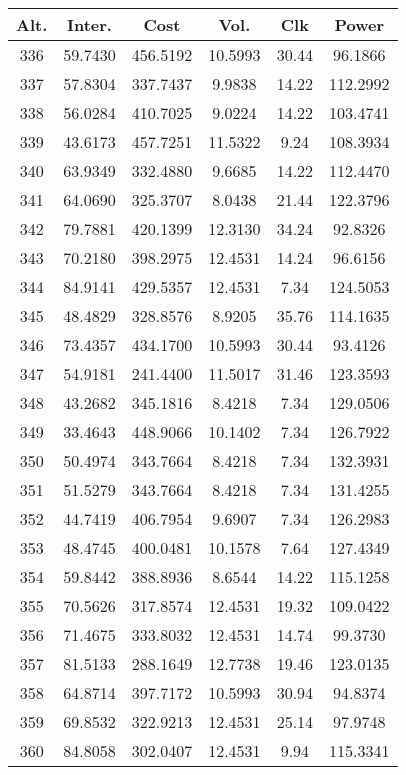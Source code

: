 \begin{center}
\begin{footnotesize}
\begin{tabular}{|c|ccccc|}
\hline
Alt. & Inter. & Cost & Vol. & Clk & Power\\
\hline
336 & 59.7430 & 456.5192 & 10.5993 & 30.44 & 96.1866 \\
337 & 57.8304 & 337.7437 & 9.9838 & 14.22 & 112.2992 \\
338 & 56.0284 & 410.7025 & 9.0224 & 14.22 & 103.4741 \\
339 & 43.6173 & 457.7251 & 11.5322 & 9.24 & 108.3934 \\
340 & 63.9349 & 332.4880 & 9.6685 & 14.22 & 112.4470 \\
341 & 64.0690 & 325.3707 & 8.0438 & 21.44 & 122.3796 \\
342 & 79.7881 & 420.1399 & 12.3130 & 34.24 & 92.8326 \\
343 & 70.2180 & 398.2975 & 12.4531 & 14.24 & 96.6156 \\
344 & 84.9141 & 429.5357 & 12.4531 & 7.34 & 124.5053 \\
345 & 48.4829 & 328.8576 & 8.9205 & 35.76 & 114.1635 \\
346 & 73.4357 & 434.1700 & 10.5993 & 30.44 & 93.4126 \\
347 & 54.9181 & 241.4400 & 11.5017 & 31.46 & 123.3593 \\
348 & 43.2682 & 345.1816 & 8.4218 & 7.34 & 129.0506 \\
349 & 33.4643 & 448.9066 & 10.1402 & 7.34 & 126.7922 \\
350 & 50.4974 & 343.7664 & 8.4218 & 7.34 & 132.3931 \\
351 & 51.5279 & 343.7664 & 8.4218 & 7.34 & 131.4255 \\
352 & 44.7419 & 406.7954 & 9.6907 & 7.34 & 126.2983 \\
353 & 48.4745 & 400.0481 & 10.1578 & 7.64 & 127.4349 \\
354 & 59.8442 & 388.8936 & 8.6544 & 14.22 & 115.1258 \\
355 & 70.5626 & 317.8574 & 12.4531 & 19.32 & 109.0422 \\
356 & 71.4675 & 333.8032 & 12.4531 & 14.74 & 99.3730 \\
357 & 81.5133 & 288.1649 & 12.7738 & 19.46 & 123.0135 \\
358 & 64.8714 & 397.7172 & 10.5993 & 30.94 & 94.8374 \\
359 & 69.8532 & 322.9213 & 12.4531 & 25.14 & 97.9748 \\
360 & 84.8058 & 302.0407 & 12.4531 & 9.94 & 115.3341 \\

\end{tabular}
\end{footnotesize}
\end{center}
